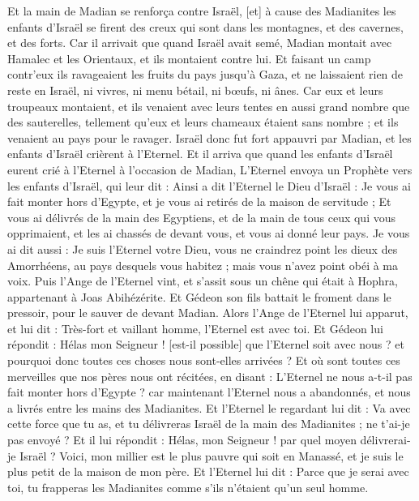 \begin{multicols}{2}
Et la main de Madian se renforça contre Israël, [et] à cause des Madianites les enfants d'Israël se firent des creux qui sont dans les montagnes, et des cavernes, et des forts.
Car il arrivait que quand Israël avait semé, Madian montait avec Hamalec et les Orientaux, et ils montaient contre lui.
Et faisant un camp contr'eux ils ravageaient les fruits du pays jusqu'à Gaza, et ne laissaient rien de reste en Israël, ni vivres, ni menu bétail, ni bœufs, ni ânes.
Car eux et leurs troupeaux montaient, et ils venaient avec leurs tentes en aussi grand nombre que des sauterelles, tellement qu'eux et leurs chameaux étaient sans nombre ; et ils venaient au pays pour le ravager.
Israël donc fut fort appauvri par Madian, et les enfants d'Israël crièrent à l'Eternel.
Et il arriva que quand les enfants d'Israël eurent crié à l'Eternel à l'occasion de Madian,
L'Eternel envoya un Prophète vers les enfants d'Israël, qui leur dit : Ainsi a dit l'Eternel le Dieu d'Israël : Je vous ai fait monter hors d'Egypte, et je vous ai retirés de la maison de servitude ;
Et vous ai délivrés de la main des Egyptiens, et de la main de tous ceux qui vous opprimaient, et les ai chassés de devant vous, et vous ai donné leur pays.
Je vous ai dit aussi : Je suis l'Eternel votre Dieu, vous ne craindrez point les dieux des Amorrhéens, au pays desquels vous habitez ; mais vous n'avez point obéi à ma voix.
Puis l'Ange de l'Eternel vint, et s'assit sous un chêne qui était à Hophra, appartenant à Joas Abihézérite. Et Gédeon son fils battait le froment dans le pressoir, pour le sauver de devant Madian.
Alors l'Ange de l'Eternel lui apparut, et lui dit : Très-fort et vaillant homme, l'Eternel est avec toi.
Et Gédeon lui répondit : Hélas mon Seigneur ! [est-il possible] que l'Eternel soit avec nous ? et pourquoi donc toutes ces choses nous sont-elles arrivées ? Et où sont toutes ces merveilles que nos pères nous ont récitées, en disant : L'Eternel ne nous a-t-il pas fait monter hors d'Egypte ? car maintenant l'Eternel nous a abandonnés, et nous a livrés entre les mains des Madianites.
Et l'Eternel le regardant lui dit : Va avec cette force que tu as, et tu délivreras Israël de la main des Madianites ; ne t'ai-je pas envoyé ?
Et il lui répondit : Hélas, mon Seigneur ! par quel moyen délivrerai-je Israël ? Voici, mon millier est le plus pauvre qui soit en Manassé, et je suis le plus petit de la maison de mon père.
Et l'Eternel lui dit : Parce que je serai avec toi, tu frapperas les Madianites comme s'ils n'étaient qu'un seul homme.

\end{multicols}
